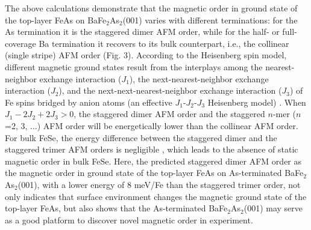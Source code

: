 \documentclass[twocolumn,aps,showpacs,prb]{revtex4-1}
\begin{document}
The above calculations demonstrate that the magnetic order in ground state of the top-layer FeAs on BaFe$_{2}$As$_{2}$(001) varies with different terminations: for the As termination it is the staggered dimer AFM order, while for the half- or full- coverage Ba termination it recovers to its bulk counterpart, i.e., the collinear (single stripe) AFM order (Fig. 3). According to the Heisenberg spin model, different magnetic ground states result from the interplays among the nearest-neighbor exchange interaction ($J_1$), the next-nearest-neighbor exchange interaction ($J_2$), and the next-next-nearest-neighbor exchange interaction ($J_3$) of Fe spins bridged by anion atoms (an effective $J_1$-$J_2$-$J_3$ Heisenberg model) \cite{Ma08,Ma09}. When $J_1-2J_2+2J_3>0$, the staggered dimer AFM order \cite{40HYCao(2015)PRB} and the staggered $n$-mer ($n$=2, 3, ...) AFM order \cite{42Kai(2016)PRB} will be energetically lower than the collinear AFM order. For bulk FeSe, the energy difference between the staggered dimer and the staggered trimer AFM orders is negligible \cite{42Kai(2016)PRB}, which leads to the absence of static magnetic order in bulk FeSe. Here, the predicted staggered dimer AFM order as the magnetic order in ground state of the top-layer FeAs on As-terminated BaFe$_{2}$As$_{2}$(001), with a lower energy of 8 meV/Fe than the staggered trimer order, not only indicates that surface environment changes the magnetic ground state of the top-layer FeAs, but also shows that the As-terminated BaFe$_{2}$As$_{2}$(001) may serve as a good platform to discover novel magnetic order in experiment.
\end{document}
